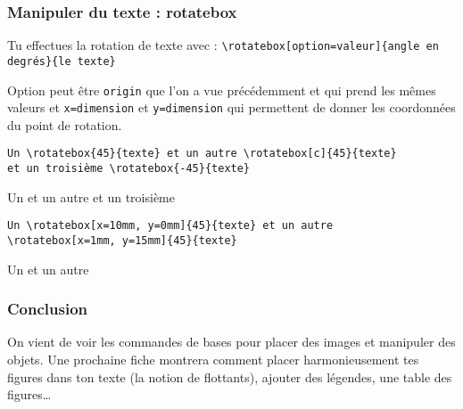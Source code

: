 \documentclass[10pt,hyperref={pdfpagemode=FullScreen},xcolor=dvipsnames,xcolor=table, xcolor=svgnames]{beamer}%
\begin{document}
 \begin{frame}[fragile]
   \frametitle{Manipuler du texte : rotatebox}
Tu effectues la rotation de texte avec :
{\color{blue}\verb!\rotatebox[option=valeur]{angle en degrés}{le texte}!}\par
Option peut être {\color{blue}\verb!origin!} que l'on a vue précédemment et qui prend les mêmes valeurs et {\color{blue}\verb!x=dimension!} et {\color{blue}\verb!y=dimension!} qui permettent de donner les coordonnées du point de rotation.
\begin{exampleblock}{}\footnotesize
\begin{verbatim}
Un \rotatebox{45}{texte} et un autre \rotatebox[c]{45}{texte}
et un troisième \rotatebox{-45}{texte} 
\end{verbatim}
\end{exampleblock}
\begin{block}{}
Un  et un autre  et un troisième  
\end{block}
\begin{exampleblock}{}\footnotesize
\begin{verbatim}
Un \rotatebox[x=10mm, y=0mm]{45}{texte} et un autre
\rotatebox[x=1mm, y=15mm]{45}{texte}
\end{verbatim}
\end{exampleblock}
\begin{block}{}
Un  et un autre 
\end{block}
\end{frame}
 \begin{frame}
   \frametitle{Conclusion}
On vient de voir les commandes de bases pour placer des images et manipuler des objets. Une prochaine fiche montrera comment placer harmonieusement tes figures dans ton texte (la notion de flottants), ajouter des légendes, une table des figures\dots
\end{frame}
\end{document}
